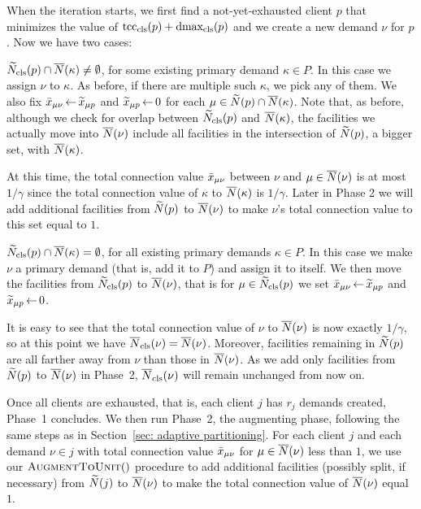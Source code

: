 When the iteration starts, we first find a not-yet-exhausted client
$p$ that minimizes the value of $\mbox{\rm{tcc}}_{\text{cls}}(p) + \mbox{\rm{dmax}}_{\text{cls}}(p)$ and
we create a new demand $\nu$ for $p$.  Now we have two cases:
%
\begin{description}
%
\item{} ${\widetilde N}_{\text{cls}}(p) \cap
  {\overline{N}}(\kappa)\neq\emptyset$, for some existing primary demand
  $\kappa\in P$.  In this case we assign $\nu$ to $\kappa$. As before, if
  there are multiple such $\kappa$, we pick any of them. We also fix
  ${\bar x}_{\mu \nu} {\,\leftarrow\,} {\widetilde x}_{\mu p}$ and ${\widetilde x}_{\mu p}{\,\leftarrow\,} 0$
  for each $\mu \in {\widetilde N}(p)\cap {\overline{N}}(\kappa)$. Note that, as before,
  although we check for overlap between ${\widetilde N}_{\text{cls}}(p)$ and
  ${\overline{N}}(\kappa)$, the facilities we actually move into
  ${\overline{N}}(\nu)$ include all facilities in the intersection of
  ${\widetilde N}(p)$, a bigger set, with ${\overline{N}}(\kappa)$.

  At this time, the total connection value ${\bar x}_{\mu\nu}$ between
  $\nu$ and $\mu\in {\overline{N}}(\nu)$ is at most $1/\gamma$ since the total
  connection value of $\kappa$ to ${\overline{N}}(\kappa)$ is
  $1/\gamma$. Later in Phase 2 we will add additional facilities from
  ${\widetilde N}(p)$ to ${\overline{N}}(\nu)$ to make $\nu$'s total connection
  value to this set equal to $1$.

%
\item{} ${\widetilde N}_{\text{cls}}(p) \cap {\overline{N}}(\kappa) =
  \emptyset$, for all existing primary demands $\kappa\in P$.  In this case
  we make $\nu$ a primary demand (that is, add it to $P$) and assign it to itself. 
  We then move the facilities from ${\widetilde N}_{\text{cls}}(p)$ to ${\overline{N}}(\nu)$, that is
  for $\mu \in {\widetilde N}_{\text{cls}}(p)$
	we set ${\bar x}_{\mu \nu}{\,\leftarrow\,} {\widetilde x}_{\mu p}$  and   ${\widetilde x}_{\mu p}\,{\leftarrow}\, 0$.  

  It is easy to see that the total connection value of $\nu$ to ${\overline{N}}(\nu)$
  is now exactly $1/\gamma$, so at this point we have ${\overline{N}}_{\text{cls}}(\nu) = {\overline{N}}(\nu)$.
Moreover, facilities remaining in
  ${\widetilde N}(p)$ are all farther away from $\nu$ than those in
  ${\overline{N}}(\nu)$. As we add only facilities from ${\widetilde N}(p)$ to ${\overline{N}}(\nu)$
  in Phase~2, ${\overline{N}}_{\text{cls}}(\nu)$ will remain unchanged from now on.
%
\end{description}
%
Once all clients are exhausted, that is, each client $j$ has $r_j$
demands created, Phase~1 concludes. We then run Phase~2, the
augmenting phase, following the same steps as in Section~\ref{sec:
  adaptive partitioning}.  For each client $j$ and each demand $\nu\in
j$ with total connection value ${\bar x}_{\mu\nu}$ for
$\mu\in{\overline{N}}(\nu)$ less than $1$, we use our ${\textsc{AugmentToUnit}}()$
procedure to add additional facilities (possibly split, if necessary)
from ${\widetilde N}(j)$ to ${\overline{N}}(\nu)$ to make the total connection value
of ${\overline{N}}(\nu)$ equal $1$.

